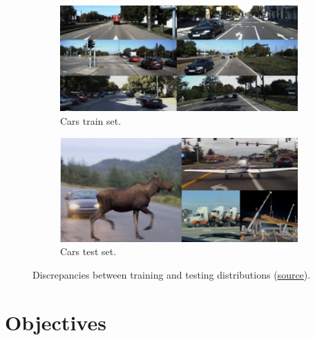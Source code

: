 \begin{figure}
     \hfill
     \begin{subfigure}[b]{0.49\textwidth}
         \centering
         \includegraphics[width=\textwidth]{figures/intro/cars_train.png}
         \caption{Cars train set.}
     \end{subfigure}
     \hfill
     \begin{subfigure}[b]{0.49\textwidth}
         \centering
         \includegraphics[width=\textwidth]{figures/intro/cars_test.png}
         \caption{Cars test set.}
     \end{subfigure}
     \caption{Discrepancies between training and testing 
     distributions (\href{http://introtodeeplearning.com/2021/slides/6S191_MIT_DeepLearning_L7.pdf}{source}).}
     \label{fig:discrepancies-train-test-distributions}
\end{figure}

\section{Objectives}

